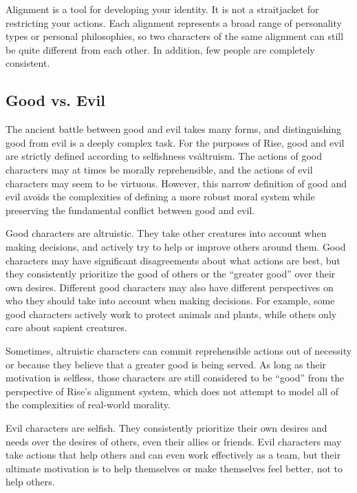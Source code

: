     Alignment is a tool for developing your identity.
    It is not a straitjacket for restricting your actions.
    Each alignment represents a broad range of personality types or personal philosophies, so two characters of the same alignment can still be quite different from each other.
    In addition, few people are completely consistent.

    \subsection{Good vs. Evil}
        The ancient battle between good and evil takes many forms, and distinguishing good from evil is a deeply complex task.
        For the purposes of Rise, good and evil are strictly defined according to selfishness vs\. altruism.
        The actions of good characters may at times be morally reprehensible, and the actions of evil characters may seem to be virtuous.
        However, this narrow definition of good and evil avoids the complexities of defining a more robust moral system while preserving the fundamental conflict between good and evil.

         Good characters are altruistic.
        They take other creatures into account when making decisions, and actively try to help or improve others around them.
        Good characters may have significant disagreements about what actions are best, but they consistently prioritize the good of others or the ``greater good'' over their own desires.
        Different good characters may also have different perspectives on who they should take into account when making decisions.
        For example, some good characters actively work to protect animals and plants, while others only care about sapient creatures.

        Sometimes, altruistic characters can commit reprehensible actions out of necessity or because they believe that a greater good is being served.
        As long as their motivation is selfless, those characters are still considered to be ``good'' from the perspective of Rise's alignment system, which does not attempt to model all of the complexities of real-world morality.

         Evil characters are selfish.
        They consistently prioritize their own desires and needs over the desires of others, even their allies or friends.
        Evil characters may take actions that help others and can even work effectively as a team, but their ultimate motivation is to help themselves or make themselves feel better, not to help others.

